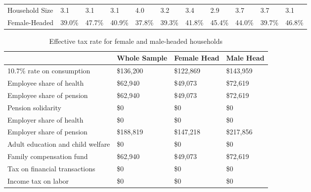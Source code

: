 \documentclass[12pt]{article}
\begin{document}
\begin{landscape}
\begin{table}[]
\begin{tabular}{lllllllllll}
Household Size                   & 3.1          & 3.1           & 3.1          & 4.0          & 3.2          & 3.4          & 2.9           & 3.7          & 3.7          & 3.1          \\
Female-Headed  & 39.0\%       & 47.7\%        & 40.9\%       & 37.8\%       & 39.3\%       & 41.8\%       & 45.4\%        & 44.0\%       & 39.7\%       & 46.8\%      \\ \hline
\end{tabular}
\end{table}

\end{landscape}


\begin{table}[]
\caption{Effective tax rate for female and male-headed households}
\label{tab:tgender}
\footnotesize
\begin{tabular}{llll} \hline
&Whole Sample                                          & Female Head & Male Head        \\ \hline
10.7\% rate on consumption              & \$136,200                & \$122,869              & \$143,959   \\
Employee share of health                              & \$62,940                 & \$49,073               & \$72,619    \\
Employee share of pension                             & \$62,940                 & \$49,073               & \$72,619    \\
Pension solidarity                                    & \$0                      & \$0                    & \$0         \\
Employer share of health                              & \$0                      & \$0                    & \$0         \\
Employer share of pension                             & \$188,819                & \$147,218              & \$217,856   \\
Adult education and child welfare                     & \$0                      & \$0                    & \$0         \\
Family compensation fund                              & \$62,940                 & \$49,073               & \$72,619    \\
Tax on financial transactions                         & \$0                      & \$0                    & \$0         \\
Income tax on labor                                   & \$0                      & \$0                    & \$0         \\

\end{tabular}
\end{table}
\end{document}
